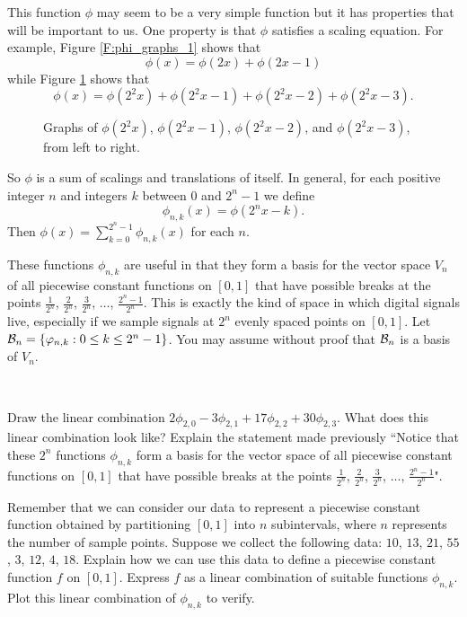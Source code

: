This function $\phi$ may seem to be a very simple function but it has properties that will be important to us. One property is that $\phi$ satisfies a scaling equation. For example, Figure \ref{F:phi_graphs_1} shows that 
\[\phi(x) = \phi(2x) + \phi(2x-1)\]
while Figure \ref{F:phi_graphs_2} shows that 
\[\phi(x) = \phi(2^2x) + \phi(2^2x-1) +  \phi(2^2x-2) + \phi(2^2x-3).\]
 \begin{figure}[h]
\begin{center}
\end{center}
\caption{Graphs of $\phi(2^2x)$, $\phi(2^2x-1)$, $\phi(2^2x-2)$, and $\phi(2^2x-3)$, from left to right.}
\label{F:phi_graphs_2}
\end{figure}
So $\phi$ is a sum of scalings and translations of itself.  In general, for each positive integer $n$ and integers $k$ between 0 and $2^n-1$ we define
\[\phi_{n,k}(x) = \phi\left(2^nx-k\right).\]
Then  $\phi(x) = \sum_{k=0}^{2^{n}-1} \phi_{n,k}(x)$ for each $n$.

These functions $\phi_{n,k}$ are useful in that they form a basis for the vector space $V_n$ of all piecewise constant functions on $[0,1]$ that have possible breaks at the points $\frac{1}{2^n}$, $\frac{2}{2^n}$, $\frac{3}{2^n}$, $\ldots$, $\frac{2^n-1}{2^n}$. This is exactly the kind of space in which digital signals live, especially if we sample signals at $2^n$ evenly spaced points on $[0,1]$. Let $\mathcal{B}_n = \{ \varphi_{n,k} : 0 \leq k \leq 2^n-1\}$. You may assume without proof that $\mathcal{B}_n$ is a basis of $V_n$. 


\begin{pactivity} ~
	\ba
	\item Draw the linear combination $2\phi_{2,0} - 3\phi_{2,1} + 17 \phi_{2,2} + 30 \phi_{2,3}$. What does this linear combination look like? Explain the statement made previously ``Notice that these $2^n$ functions $\phi_{n,k}$ form a basis for the vector space of all piecewise constant functions on $[0,1]$ that have possible breaks at the points $\frac{1}{2^n}$, $\frac{2}{2^n}$, $\frac{3}{2^n}$, $\ldots$, $\frac{2^n-1}{2^n}$". 


	\item Remember that we can consider our data to represent a piecewise constant function obtained by partitioning $[0,1]$ into $n$ subintervals, where $n$ represents the number of sample points. Suppose we collect the following data: $10$, $13$, $21$, $55$, $3$, $12$, $4$, $18$. Explain how we can use this data to define a piecewise constant function $f$ on $[0,1]$. Express $f$ as a linear combination of suitable functions $\phi_{n,k}$. Plot this linear combination of $\phi_{n,k}$ to verify. 


	\ea
\end{pactivity}

